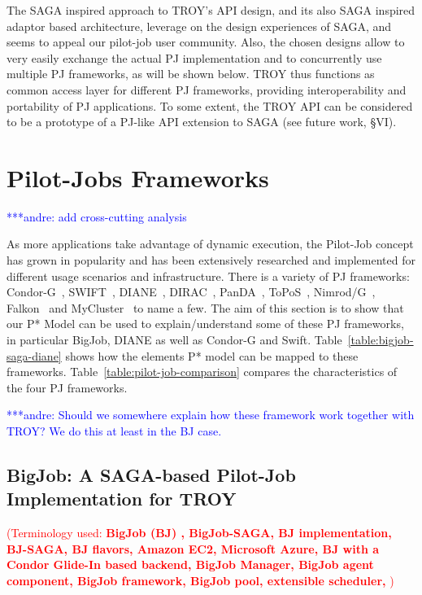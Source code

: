 \documentclass[conference,final]{IEEEtran}
\newcommand{\terminology}[1]{ {\textcolor{red} {(Terminology used: \textbf{#1}) }}}
\newcommand{\jhanote}[1]{ {\textcolor{red} { ***shantenu: #1 }}}
\newcommand{\alnote}[1]{ {\textcolor{blue} { ***andre: #1 }}}
\newcommand{\terminology}[1]{}
\newcommand{\alnote}[1]{}
\newcommand{\jhanote}[1]{}
\newcommand{\upp}{\vspace*{-0.5em}}
\begin{document}
The SAGA inspired approach to TROY's API design, and its also SAGA
inspired adaptor based architecture, leverage on the design
experiences of SAGA, and seems to appeal our pilot-job user community.
Also, the chosen designs allow to very easily exchange the actual PJ
implementation and to concurrently use multiple PJ frameworks, as
will be shown below.  TROY thus functions as common access layer for
different PJ frameworks, providing interoperability and
portability of PJ applications.  To some extent, the TROY API can be
considered to be a prototype of a PJ-like API extension to SAGA (see
future work, \S{VI}).


\section{Pilot-Jobs Frameworks\upp\upp}
\alnote{add cross-cutting analysis}

As more applications take advantage of dynamic execution, the Pilot-Job concept
has grown in popularity and has been extensively researched and implemented for
different usage scenarios and infrastructure. There is a variety of PJ
frameworks: Condor-G~\cite{condor-g}, SWIFT~\cite{Wilde2011},
DIANE~\cite{Moscicki:908910}, DIRAC~\cite{1742-6596-219-6-062049},
PanDA~\cite{1742-6596-219-6-062041}, ToPoS~\cite{topos},
Nimrod/G~\cite{10.1109/HPC.2000.846563}, Falkon~\cite{1362680} and
MyCluster~\cite{1652061} to name a few. The aim of this section is to show that
our P* Model can be used to explain/understand some of these PJ frameworks, in
particular BigJob, DIANE as well as Condor-G and Swift.
Table~\ref{table:bigjob-saga-diane} shows how the elements P* model can be
mapped to these frameworks. Table~\ref{table:pilot-job-comparison} compares the
characteristics of the four PJ frameworks.

\alnote{Should we somewhere explain how these framework work together with TROY? 
We do this at least in the BJ case.}

\subsection{BigJob: A SAGA-based Pilot-Job Implementation for
  TROY\upp\upp}
\terminology{BigJob (BJ) , BigJob-SAGA, BJ implementation,  BJ-SAGA, BJ flavors, Amazon EC2, Microsoft Azure,
 BJ with a Condor Glide-In based backend,  BigJob Manager, BigJob agent component, BigJob framework,
 BigJob pool, extensible scheduler, } 


\end{document}
